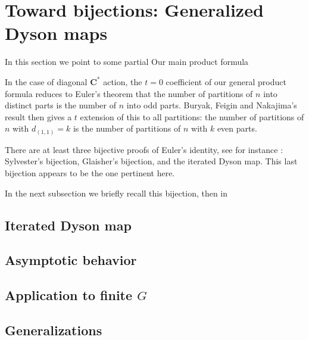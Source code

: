 \documentclass{amsart}[12pt]
\theoremstyle{definition}
\newcommand{\C}{\mathbf{C}}
\begin{document}
\section{Toward bijections: Generalized Dyson maps} \label{sec:dyson}

In this section we point to some partial Our main product formula 

In the case of diagonal $\C^*$ action, the $t=0$ coefficient of our general product formula reduces to Euler's theorem that the number of partitions of $n$ into distinct parts is the number of $n$ into odd parts.  Buryak, Feigin and Nakajima's result then gives a $t$ extension of this to all partitions: the number of partitions of $n$ with $d_{(1,1)}=k$ is the number of partitions of $n$ with $k$ even parts.

There are at least three bijective proofs of Euler's identity, see for instance \cite{pak}: Sylvester's bijection, Glaisher's bijection, and the iterated Dyson map.  This last bijection appears to be the one pertinent here.

In the next subsection we briefly recall this bijection, then in 
\subsection{Iterated Dyson map} \label{sec:review-dyson}


\subsection{Asymptotic behavior} \label{sec-asymptotic-dyson}

\subsection{Application to finite \texorpdfstring{$G$}{G}} 


\subsection{Generalizations} \label{sec:generalized-dyson}






\end{document}
